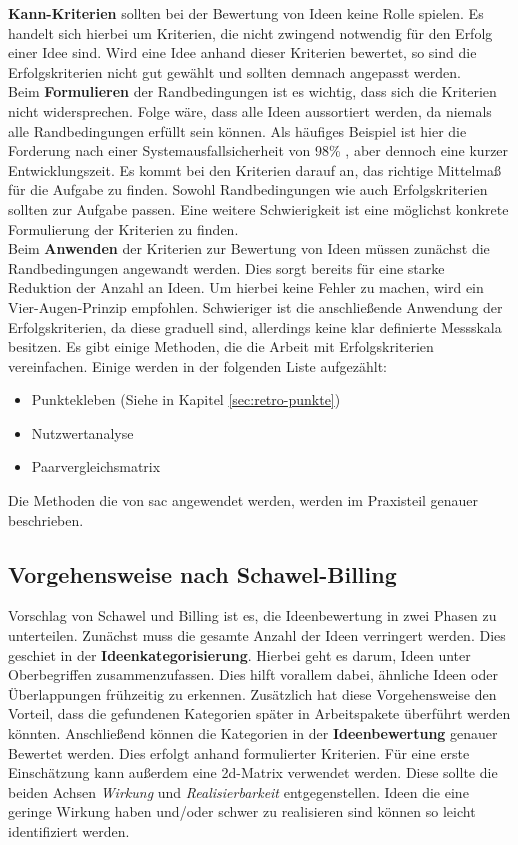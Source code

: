 \textbf{Kann-Kriterien} sollten bei der Bewertung von Ideen keine Rolle spielen. Es handelt sich hierbei 
um Kriterien, die nicht zwingend notwendig für den Erfolg einer Idee sind. Wird eine Idee anhand dieser Kriterien 
bewertet, so sind die Erfolgskriterien nicht gut gewählt und sollten demnach angepasst werden.\\

Beim \textbf{Formulieren} der Randbedingungen ist es wichtig, dass sich die Kriterien nicht
widersprechen. Folge wäre, dass alle Ideen aussortiert werden, da niemals alle Randbedingungen erfüllt sein können.
Als häufiges Beispiel ist hier die Forderung nach einer Systemausfallsicherheit von 98\% , aber dennoch eine 
kurzer Entwicklungszeit. 
Es kommt bei den Kriterien darauf an, das richtige Mittelmaß für die Aufgabe zu finden. 
Sowohl Randbedingungen wie auch Erfolgskriterien sollten zur Aufgabe passen. Eine weitere Schwierigkeit ist eine möglichst konkrete
Formulierung der Kriterien zu finden. \\

Beim \textbf{Anwenden} der Kriterien zur Bewertung von Ideen müssen zunächst die Randbedingungen angewandt werden. 
Dies sorgt bereits für eine starke Reduktion der Anzahl an Ideen. Um hierbei keine Fehler zu machen, wird 
ein Vier-Augen-Prinzip empfohlen. 
Schwieriger ist die anschließende Anwendung der Erfolgskriterien, da diese graduell sind, allerdings keine klar 
definierte Messskala besitzen. 
Es gibt einige Methoden, die die Arbeit mit Erfolgskriterien vereinfachen. Einige werden 
in der folgenden Liste aufgezählt: 
\begin{itemize}
    \item Punktekleben (Siehe in Kapitel \ref{sec:retro-punkte})
    \item Nutzwertanalyse
    \item Paarvergleichsmatrix
\end{itemize}
Die Methoden die von \ac{sac} angewendet werden, werden im Praxisteil genauer beschrieben. \cite{zephram:2018}

\subsection{Vorgehensweise nach Schawel-Billing}
Vorschlag von Schawel und Billing ist es, die Ideenbewertung in zwei Phasen zu unterteilen. Zunächst muss die gesamte Anzahl 
der Ideen verringert werden. Dies geschiet in der \textbf{Ideenkategorisierung}. Hierbei geht es darum, Ideen unter 
Oberbegriffen zusammenzufassen. Dies hilft vorallem dabei, ähnliche Ideen oder Überlappungen frühzeitig zu erkennen.
Zusätzlich hat diese Vorgehensweise den Vorteil, dass die gefundenen Kategorien später in Arbeitspakete überführt werden 
könnten. Anschließend können die Kategorien in der \textbf{Ideenbewertung} genauer Bewertet werden. 
Dies erfolgt anhand formulierter Kriterien. Für eine erste Einschätzung kann außerdem eine \ac{2d}-Matrix verwendet werden. 
Diese sollte die beiden Achsen \textit{Wirkung} und \textit{Realisierbarkeit} entgegenstellen. Ideen die eine geringe Wirkung haben und/oder 
schwer zu realisieren sind können so leicht identifiziert werden. \cite{schawel:2009}